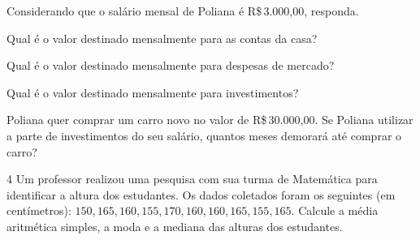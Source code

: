 Considerando que o salário mensal de Poliana é R\$\,3.000,00, responda.

\begin{escolha}[itemsep=0pt]
\item Qual é o valor destinado mensalmente para as contas da casa?

    
    

\item Qual é o valor destinado mensalmente para despesas de mercado?




\item Qual é o valor destinado mensalmente para investimentos?




\item Poliana quer comprar um carro novo no valor de R\$\,30.000,00.
Se Poliana utilizar a parte de investimentos do seu salário, quantos meses
demorará até comprar o carro?



\end{escolha}

\num{4} Um professor realizou uma pesquisa com sua turma de Matemática para
identificar a altura dos estudantes. Os dados coletados foram os
seguintes (em centímetros): $150, 165, 160, 155, 170, 160, 160, 165, 155, 165$.
Calcule a média aritmética simples, a moda e a mediana das alturas dos
estudantes.


